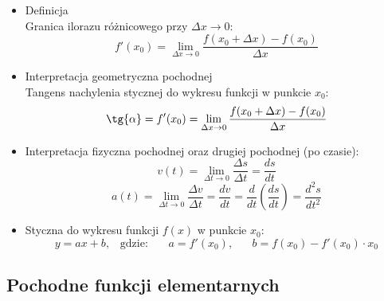 \documentclass[10pt, twoside, fleqn]{article}
\begin{document}
		\begin{itemize}

			\item	Definicja
					\\Granica ilorazu różnicowego przy $\Delta x \to 0$:
						\begin{equation*}
							f'(x_0) = 
							\lim_{\Delta x \to 0} 
							{\frac{f(x_0 + \Delta x) - f(x_0)}{\Delta x}} 
						\end{equation*}

			\item	Interpretacja geometryczna pochodnej
					\\Tangens nachylenia stycznej do wykresu funkcji
					w punkcie $x_0$:
						\begin{equation*}
							\tg{\alpha} = f'(x_0) = 
							\lim_{\Delta x \to 0} 
							{\frac{f(x_0 + \Delta x) - f(x_0)}{\Delta x}} 
						\end{equation*}

			\item	Interpretacja fizyczna pochodnej oraz drugiej
					pochodnej (po czasie):
						\begin{equation*}
							v(t) = 
							\lim_{\Delta t \to 0} \frac{\Delta s}{\Delta t}
								 = \frac{d s}{d t} 
						\end{equation*}
						\begin{equation*}
							a(t) = 
							\lim_{\Delta t \to 0} \frac{\Delta v}{\Delta t}
								 = \frac{d v}{d t}
								 = \frac{d}{dt} \left( \frac{d s}{d t} \right)
								 = \frac{d^2 s}{dt^2}
						\end{equation*}	
					
			\item	Styczna do wykresu funkcji $f(x)$ w punkcie $x_0$:
						\begin{equation*}
							y = ax + b, 
								\hspace{10pt} \mathrm{gdzie:} 
								\hspace{20pt} a = f'(x_0),
								\hspace{20pt} b = f(x_0) - f'(x_0) \cdot x_0
						\end{equation*}		
				
		\end{itemize}

		\vspace{7pt}		
		
\subsection{Pochodne funkcji elementarnych}
\end{document}
